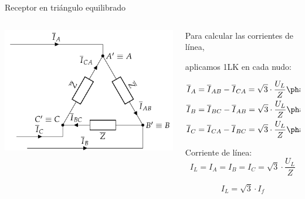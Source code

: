 \documentclass[aspectratio=169, usenames,svgnames,dvipsnames]{beamer}
\begin{document}
\begin{frame}{Receptor en triángulo equilibrado}
    \begin{columns}
    \begin{column}{0.5\columnwidth}
            \includegraphics[width=.9\linewidth]{../figs/TrianguloEquilibrado_Receptor.pdf}
    \end{column}
    
    \begin{column}{0.5\columnwidth}
        
        \vspace{3mm}
        \small{Para calcular las corrientes de línea,} 
        
        \small{aplicamos \alert{1LK} en cada nudo:}

        \vspace{-3mm}
        \begin{align*}
          \overline{I}_A &= \overline{I}_{AB} - \overline{I}_{CA} = \sqrt{3} \cdot \frac{U_L}{Z}\phase{\ang{\pm 90} - \theta}\\
          \overline{I}_B &= \overline{I}_{BC} - \overline{I}_{AB} = \sqrt{3} \cdot \frac{U_L}{Z}\phase{\ang{\mp 30} - \theta}\\
          \overline{I}_C &= \overline{I}_{CA} - \overline{I}_{BC} = \sqrt{3} \cdot \frac{U_L}{Z}\phase{\ang{\mp 150} - \theta}\\
        \end{align*}
        
        \normalsize
        \vspace{-3mm}
        Corriente de \alert{línea}:
        \[
          \boxed{I_L = {I}_A = {I}_B = {I}_C = \sqrt{3} \cdot \frac{U_L}{Z}}
        \]

        \vspace{-2mm}
        \[
          \boxed{I_L = \sqrt{3} \cdot I_f}
        \]
    \end{column}
    \end{columns}
\end{frame}
\end{document}
